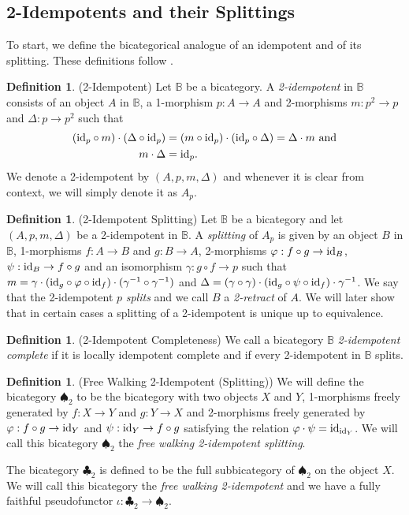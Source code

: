 \documentclass[12pt,oneside,reqno,a4paper]{article}
\theoremstyle{definition}
\newtheorem{definition}[theorem]{Definition}
\newcommand{\clb}{\clubsuit}
\newcommand{\spd}{\spadesuit}
\renewcommand{\phi}{\varphi}
\newcommand{\id}{\textup{id}}
\newcommand{\bB}{\mathbb{B}}
\begin{document}
\subsection{2-Idempotents and their Splittings}

To start, we define the bicategorical analogue of an idempotent and of its splitting. These definitions follow \cite{GJF}.

\begin{definition}{(2-Idempotent)}
Let $\bB$ be a bicategory. A \textit{2-idempotent} in $\bB$ consists of an object $A$ in $\bB$, a 1-morphism $p:A\to A$ and 2-morphisms $m:p^2\to p$ and $\Delta:p\to p^2$ such that 
	\begin{align*}
	(\id_p\circ m)\cdot(\Delta\circ \id_p) & =(m\circ \id_p)\cdot(\id_p\circ\Delta)=\Delta\cdot m \text{ and}\\ 
	m\cdot \Delta & =\id_p.
	\end{align*}
We denote a 2-idempotent by $(A,p,m,\Delta)$ and whenever it is clear from context, we will simply denote it as $A_p$.
\end{definition}

\begin{definition}{(2-Idempotent Splitting)}
Let $\bB$ be a bicategory and let $(A,p,m,\Delta)$ be a 2-idempotent in $\bB$. A \textit{splitting} of $A_p$ is given by an object $B$ in $\bB$, 1-morphisms $f:A\to B$ and $g:B\to A$, 2-morphisms $\varphi:f\circ g\to \id_B$, $\psi:\id_B \to f\circ g$ and an isomorphism $\gamma:g\circ f\to p$ such that $m=\gamma\cdot(\id_g \circ \varphi \circ \id_f)\cdot(\gamma^{-1}\circ\gamma^{-1})$ and $\Delta=(\gamma\circ\gamma)\cdot(\id_g \circ \psi \circ \id_f)\cdot\gamma^{-1}$. We say that the 2-idempotent $p$ \textit{splits} and we call $B$ a \textit{2-retract} of $A$. We will later show that in certain cases a splitting of a 2-idempotent is unique up to equivalence.
\end{definition}

\begin{definition}{(2-Idempotent Completeness)}
We call a bicategory $\bB$ \textit{2-idem\-po\-tent complete} if it is locally idempotent complete and if every 2-idempotent in $\bB$ splits.
\end{definition}

\begin{definition}{(Free Walking 2-Idempotent (Splitting))} \label{walkin}
We will define the bicategory $\spd_2$ to be the bicategory with two objects $X$ and $Y$, 1-morphisms freely generated by $f:X\to Y$ and $g:Y\to X$ and 2-morphisms freely generated by $\phi:f\circ g\to \id_Y$ and $\psi:\id_Y \to f\circ g$ satisfying the relation $\varphi\cdot\psi=\id_{\id_Y}$. We will call this bicategory $\spd_2$ the \textit{free walking 2-idempotent splitting}.

The bicategory $\clb_2$ is defined to be the full subbicategory of $\spd_2$ on the object $X$. We will call this bicategory the \textit{free walking 2-idempotent} and we have a fully faithful pseudofunctor $\iota:\clb_2\to\spd_2$.
\end{definition}
\end{document}
